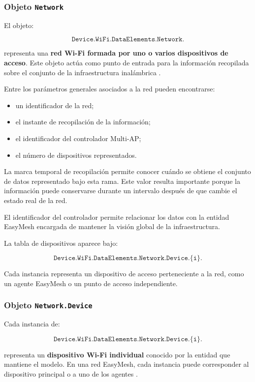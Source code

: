 \subsubsection*{Objeto \texttt{Network}}

El objeto:

\[
    \texttt{Device.WiFi.DataElements.Network.}
\]

representa una \textbf{red Wi-Fi formada por uno o varios dispositivos
de acceso}. Este objeto actúa como punto de entrada para la información
recopilada sobre el conjunto de la infraestructura inalámbrica
\cite{bbf_tr181}.

Entre los parámetros generales asociados a la red pueden encontrarse:

\begin{itemize}
    \item un identificador de la red;
    \item el instante de recopilación de la información;
    \item el identificador del controlador Multi-AP;
    \item el número de dispositivos representados.
\end{itemize}

La marca temporal de recopilación permite conocer cuándo se obtiene el
conjunto de datos representado bajo esta rama. Este valor resulta
importante porque la información puede conservarse durante un intervalo
después de que cambie el estado real de la red.

El identificador del controlador permite relacionar los datos con la
entidad EasyMesh encargada de mantener la visión global de la
infraestructura.

La tabla de dispositivos aparece bajo:

\[
    \texttt{Device.WiFi.DataElements.Network.Device.\{i\}.}
\]

Cada instancia representa un dispositivo de acceso perteneciente a la
red, como un agente EasyMesh o un punto de acceso independiente.


\subsubsection*{Objeto \texttt{Network.Device}}

Cada instancia de:

\[
    \texttt{Device.WiFi.DataElements.Network.Device.\{i\}.}
\]

representa un \textbf{dispositivo Wi-Fi individual} conocido por la
entidad que mantiene el modelo. En una red EasyMesh, cada instancia puede
corresponder al dispositivo principal o a uno de los agentes
\cite{bbf_tr181}.


